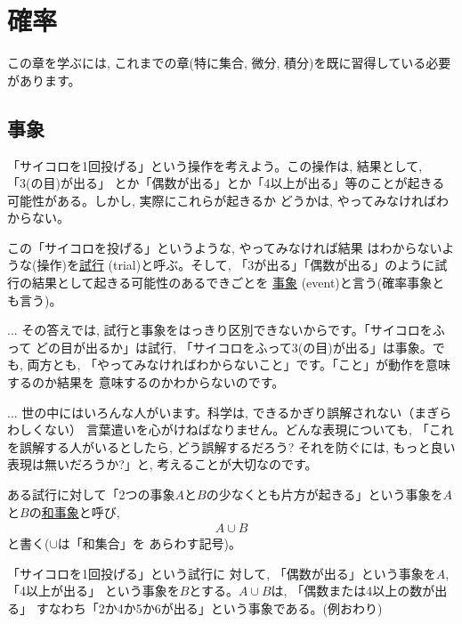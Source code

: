 \chapter{確率}

{\small この章を学ぶには, これまでの章(特に集合, 微分, 積分)を既に習得している必要があります。\\}

\section{事象}

「サイコロを1回投げる」という操作を考えよう。この操作は, 結果として, 「3(の目)が出る」
とか「偶数が出る」とか「4以上が出る」等のことが起きる可能性がある。しかし, 実際にこれらが起きるか
どうかは, やってみなければわからない。

この「サイコロを投げる」というような, やってみなければ結果
はわからないような(操作)を\underline{試行} (trial)と呼ぶ。そして, 
「3が出る」「偶数が出る」のように試行の結果として起きる可能性のあるできごとを
\underline{事象}  (event)と言う(確率事象とも言う)。

\begin{faq}{\small{}
... その答えでは, 試行と事象をはっきり区別できないからです。「サイコロをふって
どの目が出るか」は試行, 「サイコロをふって3(の目)が出る」は事象。でも, 両方とも, 
「やってみなければわからないこと」です。「こと」が動作を意味するのか結果を
意味するのかわからないのです。}\end{faq}

\begin{faq}{\small{}
... 世の中にはいろんな人がいます。科学は, できるかぎり誤解されない（まぎらわしくない）
言葉遣いを心がけねばなりません。どんな表現についても, 「これを誤解する人がいるとしたら, どう誤解するだろう? 
それを防ぐには, もっと良い表現は無いだろうか?」と, 考えることが大切なのです。}\end{faq}

ある試行に対して「2つの事象$A$と$B$の少なくとも片方が起きる」という事象を$A$と$B$の\underline{和事象}と呼び, 
\begin{eqnarray}A\cup B\label{eq:sumset}\end{eqnarray}と書く($\cup$は「和集合」を
あらわす記号)。

\begin{exmpl}\label{exmpl:event01} 「サイコロを1回投げる」という試行に
対して, 「偶数が出る」という事象を$A$, 「4以上が出る」
という事象を$B$とする。$A\cup B$は, 「偶数または4以上の数が出る」
すなわち「2か4か5か6が出る」という事象である。(例おわり)\end{exmpl}

